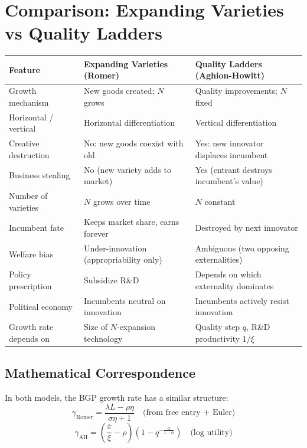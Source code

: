 \documentclass[a4paper,11pt]{article}
\newcommand{\pibar}{\overline{\pi}}
\begin{document}
\clearpage

\section{Comparison: Expanding Varieties vs Quality Ladders}

\begin{center}
\begin{tabular}{lp{5.5cm}p{5.5cm}}
\toprule
\textbf{Feature} & \textbf{Expanding Varieties (Romer)} & \textbf{Quality Ladders (Aghion-Howitt)} \\
\midrule
Growth mechanism & New goods created; $N$ grows & Quality improvements; $N$ fixed \\
Horizontal / vertical & Horizontal differentiation & Vertical differentiation \\
Creative destruction & No: new goods coexist with old & Yes: new innovator displaces incumbent \\
Business stealing & No (new variety adds to market) & Yes (entrant destroys incumbent's value) \\
Number of varieties & $N$ grows over time & $N$ constant \\
Incumbent fate & Keeps market share, earns forever & Destroyed by next innovator \\
Welfare bias & Under-innovation (appropriability only) & Ambiguous (two opposing externalities) \\
Policy prescription & Subsidize R\&D & Depends on which externality dominates \\
Political economy & Incumbents neutral on innovation & Incumbents actively resist innovation \\
Growth rate depends on & Size of $N$-expansion technology & Quality step $q$, R\&D productivity $1/\xi$ \\
\bottomrule
\end{tabular}
\end{center}

\subsection*{Mathematical Correspondence}

In both models, the BGP growth rate has a similar structure:
\[
\gamma_{\text{Romer}} = \frac{\lambda L - \rho \eta}{\sigma \eta + 1} \quad \text{(from free entry + Euler)}
\]
\[
\gamma_{\text{AH}} = \left(\frac{\pibar}{\xi} - \rho\right)\!\left(1 - q^{-\frac{\alpha}{1-\alpha}}\right) \quad \text{(log utility)}
\]
\end{document}
